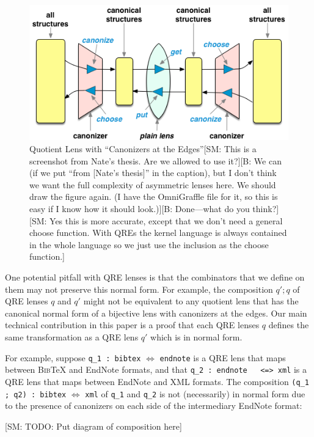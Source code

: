 \documentclass{svproc}
\newcommand{\cd}[1]{\lstinline[backgroundcolor=\color{white}]$#1$}
\newcommand{\FINISH}[3]{\ifdraft\textcolor{#1}{[#2: #3]}\fi}
\newcommand{\bcp}[1]{\FINISH{dkred}{B}{#1}}
\newcommand{\sam}[1]{\FINISH{dkpurple}{SM}{#1}}
\newcommand{\bibtex}{\textsc{Bib}\TeX{}}
\begin{document}
\begin{figure}[t]
  \centering
  \includegraphics[width=\textwidth]{canonizers-outside}
  \caption{Quotient Lens with ``Canonizers at the Edges''\sam{This is a
      screenshot from Nate's thesis. Are we allowed to use it?}\bcp{We can
      (if we put ``from [Nate's thesis]'' in the caption), but I don't think
      we want the full complexity of asymmetric lenses here.  We should draw
      the figure again.  (I have the OmniGraffle file for it, so this is
      easy if I know how it should look.)}\bcp{Done---what do you think?}
      \sam{Yes this is more accurate, except that we don't need a general choose
      function. With QREs the kernel language is always contained in the whole
      language so we just use the inclusion as the choose function.}}
  \label{fig:attheedges}
\end{figure}

One potential pitfall with QRE lenses is that the combinators that we define on
them may not preserve this normal form. For example, the composition $q'; q$ of
QRE lenses $q$ and $q'$ might not be equivalent to any quotient lens that has
the canonical normal form of a bijective lens with canonizers at the edges.
Our main technical contribution in this paper is a proof that each QRE lenses
$q$ defines the same transformation as a QRE lens $q'$ which is in normal form.

For example, suppose \cd{q_1 : bibtex} $\Leftrightarrow$ \cd{endnote} is a QRE
lens that maps between \bibtex{} and EndNote formats, and that \cd{q_2 : endnote
  <=> xml} is a QRE lens that maps between EndNote and XML formats. The
composition \cd{(q_1 ; q2) : bibtex} $\Leftrightarrow$ \cd{xml} of \cd{q_1} and
\cd{q_2} is not (necessarily) in normal form due to the presence of canonizers
on each side of the intermediary EndNote format:

\sam{TODO: Put diagram of composition here}
\end{document}
